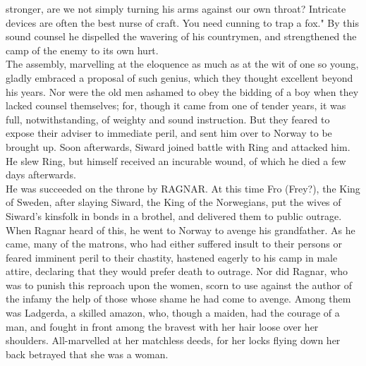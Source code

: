 \documentclass[10pt,a4paper]{report}
\begin{document}
stronger, are we not simply turning his arms against our own throat? Intricate devices are often the best nurse of craft. You need cunning to trap a fox." By this sound counsel he dispelled the wavering of his countrymen, and strengthened the camp of the enemy to its own hurt.\\

The assembly, marvelling at the eloquence as much as at the wit of one so young, gladly embraced a proposal of such genius, which they thought excellent beyond his years. Nor were the old men ashamed to obey the bidding of a boy when they lacked counsel themselves; for, though it came from one of tender years, it was full, notwithstanding, of weighty and sound instruction. But they feared to expose their adviser to immediate peril, and sent him over to Norway to be brought up. Soon afterwards, Siward joined battle with Ring and attacked him. He slew Ring, but himself received an incurable wound, of which he died a few days afterwards.\\

He was succeeded on the throne by RAGNAR. At this time Fro (Frey?), the King of Sweden, after slaying Siward, the King of the Norwegians, put the wives of Siward's kinsfolk in bonds in a brothel, and delivered them to public outrage. When Ragnar heard of this, he went to Norway to avenge his grandfather. As he came, many of the matrons, who had either suffered insult to their persons or feared imminent peril to their chastity, hastened eagerly to his camp in male attire, declaring that they would prefer death to outrage. Nor did Ragnar, who was to punish this reproach upon the women, scorn to use against the author of the infamy the help of those whose shame he had come to avenge. Among them was Ladgerda, a skilled amazon, who, though a maiden, had the courage of a man, and fought in front among the bravest with her hair loose over her shoulders. All-marvelled at her matchless deeds, for her locks flying down her back betrayed that she was a woman.\\
\end{document}
